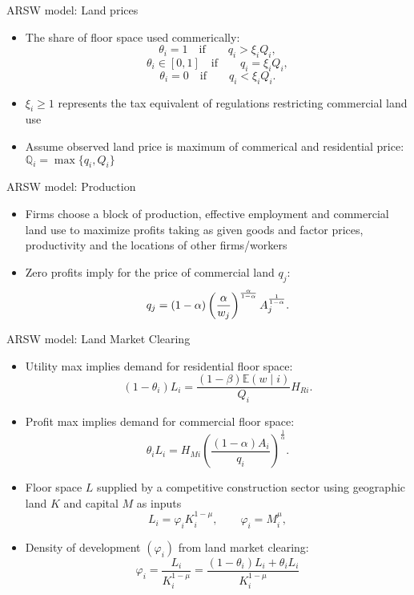 \documentclass[11pt,notes=hide,aspectratio=169]{beamer}
\begin{document}
\begin{frame}{ARSW model: Land prices}
\begin{itemize}
\item The share of floor space used commerically:
\begin{equation*} \label{eq_na}
\theta_i = 1 \quad \text{if} \qquad q_i> \xi_i Q_i,
\end{equation*}
\[
\theta_i \in [0,1] \quad  \text{if} \qquad q_i = \xi_i Q_i,
\]
\[
\theta_i = 0 \quad  \text{if} \qquad q_i < \xi_i Q_i.
\]
\item $\xi_i \geq 1$ represents the tax equivalent of regulations restricting commercial land use
\item Assume observed land price is maximum of commerical and residential price: $\mathbb{Q}_{i} = \max\{q_i,Q_i\}$
\end{itemize}
\end{frame}
\begin{frame}{ARSW model: Production}
\begin{itemize}
\item Firms choose a block of production, effective employment and commercial land use to maximize profits taking as given goods and factor prices, productivity and the locations of other firms/workers
\item Zero profits imply for the price of commercial land $q_{j}$:
\begin{equation*} \label{eq:zp}
q_{j}=(1-\alpha )\left( \frac{\alpha }{w_{j}}\right) ^{\frac{\alpha }{%
1-\alpha }}A_{j}^{\frac{1}{1-\alpha }}.
\end{equation*}
\end{itemize}
\end{frame}
\begin{frame}{ARSW model: Land Market Clearing}
\begin{itemize}
\item Utility max implies demand for residential floor space:
\begin{equation*} \label{eq:res_mc}
(1-\theta_{i}) L_{i} = \frac{ (1-\beta) \mathbb{E}(w \mid i) }{Q_i} H_{Ri}.
\end{equation*}
\item Profit max implies demand for commercial floor space:
\begin{equation*} \label{eq:com_mc}
\theta_{i} L_{i} = H_{Mi} \left( \frac{(1-\alpha) A_{i}}{q_{i}} \right)^{\frac{1}{\alpha}}.
\end{equation*}
\item Floor space $L$ supplied by a competitive construction sector using geographic land $K$ and capital $M$ as inputs
\begin{equation*}
L_{i} = \varphi_{i} K_{i}^{1-\mu} , \qquad \varphi_{i}=M_{i}^{\mu},
\end{equation*}
\item Density of development $(\varphi_{i})$ from land market clearing:
\[
\varphi_{i} = \frac{L_{i}}{K_{i}^{1-\mu}} = \frac{(1-\theta_{i}) L_{i} + \theta_{i} L_{i}}{K_{i}^{1-\mu}}
\]
\end{itemize}
\end{frame}
\end{document}
